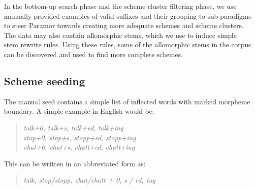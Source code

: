 \documentclass[11pt]{article}
\newcommand{\e}[1]{\textit{#1}} %
\newcommand{\todoja}[1]{[\textbf{TODOJ} #1]}
\begin{document}
In the bottom-up search phase and the scheme cluster filtering phase, we use manually provided examples of valid suffixes and their grouping to sub-paradigms to steer Paramor towards creating more adequate schemes and scheme clusters. The data may also contain allomorphic stems, which we use to induce simple stem rewrite rules. Using these rules, some of the allomorphic stems in the corpus can be discovered and used to find more complete schemes. %




\subsection{Scheme seeding}


\noindent
The manual seed contains a simple list of inflected words with marked morpheme boundary. A simple example in English would be:
\begin{quote}
\e{talk+0, talk+s, talk+ed, talk+ing}\\
\e{stop+0, stop+s, stopp+ed, stopp+ing}\\
\e{chat+0, chat+s, chatt+ed, chatt+ing}
%
\end{quote}

\noindent
This can be written in an abbreviated form as:

\begin{quote}
\e{talk, stop/stopp, chat/chatt +  0, s / ed, ing}
\end{quote}
\end{document}
